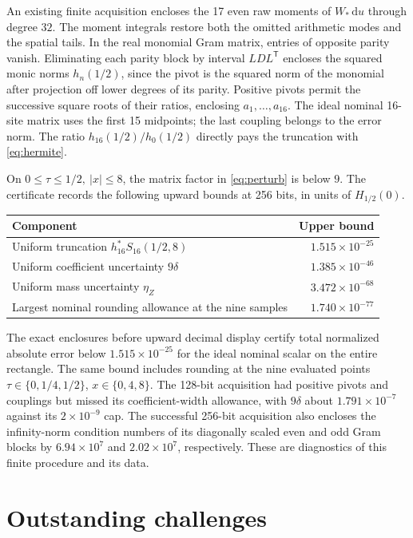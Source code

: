 \documentclass[11pt]{article}
\numberwithin{equation}{section}
\newcommand{\dd}{\,\mathrm d}
\begin{document}
An existing finite acquisition \cite{certificate} encloses the
17 even raw moments of \(W_*\dd u\) through degree \(32\).
The moment integrals restore both the omitted arithmetic modes
and the spatial tails. In the real monomial Gram matrix, entries
of opposite parity vanish. Eliminating each parity block by
interval \(LDL^{\mathsf T}\) encloses the squared monic norms
\(h_n(1/2)\), since the pivot is the squared norm of the monomial
after projection off lower degrees of its parity. Positive
pivots permit the successive square roots of their ratios,
enclosing \(a_1,\ldots,a_{16}\). The ideal nominal 16-site
matrix uses the first 15 midpoints; the last coupling belongs
to the error norm. The ratio \(h_{16}(1/2)/h_0(1/2)\) directly
pays the truncation with \eqref{eq:hermite}.

On \(0\le\tau\le1/2,\ |x|\le8\), the matrix factor in
\eqref{eq:perturb} is below \(9\). The certificate records the
following upward bounds at 256 bits, in units of \(H_{1/2}(0)\).
\begin{center}
 \begin{tabular}{@{}lr@{}}
 \toprule
 Component & Upper bound\\
 \midrule
 Uniform truncation \(h_{16}^*S_{16}(1/2,8)\)
       & \(1.515\times10^{-25}\)\\
 Uniform coefficient uncertainty \(9\delta\)
       & \(1.385\times10^{-46}\)\\
 Uniform mass uncertainty \(\eta_Z\)
       & \(3.472\times10^{-68}\)\\
 Largest nominal rounding allowance at the nine samples
       & \(1.740\times10^{-77}\)\\
 \bottomrule
 \end{tabular}
\end{center}
The exact enclosures before upward decimal display certify
total normalized absolute error below \(1.515\times 10^{-25}\)
for the ideal nominal scalar on the entire rectangle. The
same bound includes rounding at the nine evaluated points
\(\tau\in\{0,1/4,1/2\}\), \(x\in\{0,4,8\}\).
The 128-bit acquisition had positive pivots and couplings but
missed its coefficient-width allowance, with \(9\delta\) about
\(1.791\times10^{-7}\) against its \(2\times10^{-9}\) cap.
The successful 256-bit acquisition also encloses the infinity-norm
condition numbers of its diagonally scaled even and odd Gram
blocks by \(6.94\times10^7\) and \(2.02\times10^7\), respectively.
These are diagnostics of this finite procedure and its data.

\section{Outstanding challenges}\label{sec:challenges}
\end{document}
